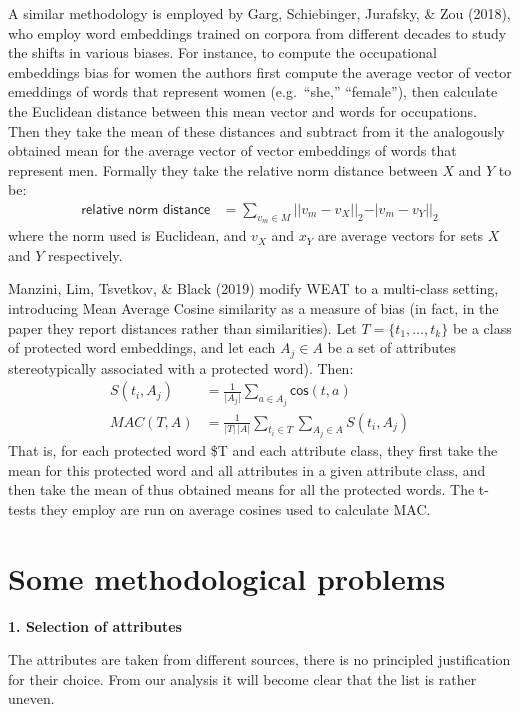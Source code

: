 \documentclass[
  10pt,
  dvipsnames,enabledeprecatedfontcommands]{scrartcl}
\begin{document}
A similar methodology is employed by Garg, Schiebinger, Jurafsky, \& Zou
(2018), who employ word embeddings trained on corpora from different
decades to study the shifts in various biases. For instance, to compute
the occupational embeddings bias for women the authors first compute the
average vector of vector emeddings of words that represent women
(e.g.~``she,'' ``female''), then calculate the Euclidean distance
between this mean vector and words for occupations. Then they take the
mean of these distances and subtract from it the analogously obtained
mean for the average vector of vector embeddings of words that represent
men. Formally they take the relative norm distance between \(X\) and
\(Y\) to be: \begin{align}
\textsf{relative norm distance} & = \sum_{v_m\in M} \vert \vert v_m - v_X\vert \vert_2 - \vert v_m - v_Y\vert \vert_2
\end{align} \noindent where the norm used is Euclidean, and \(v_X\) and
\(x_Y\) are average vectors for sets \(X\) and \(Y\) respectively.

Manzini, Lim, Tsvetkov, \& Black (2019) modify WEAT to a multi-class
setting, introducing Mean Average Cosine similarity as a measure of bias
(in fact, in the paper they report distances rather than similarities).
Let \(T = \{t_1, \dots, t_k\}\) be a class of protected word embeddings,
and let each \(A_j\in A\) be a set of attributes stereotypically
associated with a protected word). Then: \begin{align}
S(t_i, A_j) & = \frac{1}{\vert A_j\vert}\sum_{a\in A_j}\mathsf{cos}(t,a) \\
MAC(T,A) & = \frac{1}{\vert T \vert \,\vert A\vert}\sum_{t_i \in T }\sum_{A_j \in A} S(t_i,A_j)
\end{align} That is, for each protected word \$T and each attribute
class, they first take the mean for this protected word and all
attributes in a given attribute class, and then take the mean of thus
obtained means for all the protected words. The t-tests they employ are
run on average cosines used to calculate MAC.

\hypertarget{some-methodological-problems}{%
\section{Some methodological
problems}\label{some-methodological-problems}}

\textbf{1. Selection of attributes}

The attributes are taken from different sources, there is no principled
justification for their choice. From our analysis it will become clear
that the list is rather uneven.
\end{document}
